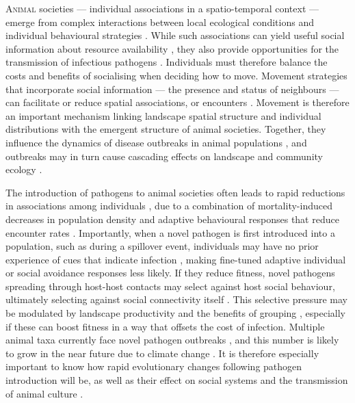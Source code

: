 
\newrefcontext[sorting=ynt]

\lettrine{A}{nimal} societies --- individual associations in a spatio-temporal context --- emerge from complex interactions between local ecological conditions and individual behavioural strategies \citep[][]{whitehead2008,tanner2012,webber2018}.
While such associations can yield useful social information about resource availability \citep{danchin2004,dall2005,gil2018}, they also provide opportunities for the transmission of infectious pathogens \citep[][]{krause2002,weinstein2018,romano2020,albery2021,cantor2021,romano2021}.
Individuals must therefore balance the costs and benefits of socialising when deciding how to move.
Movement strategies that incorporate social information --- the presence and status of neighbours --- can facilitate or reduce spatial associations, or encounters \citep{danchin2004,dall2005,nathan2008a,gil2018,webber2018,webber2022}.
Movement is therefore an important mechanism linking landscape spatial structure and individual distributions with the emergent structure of animal societies.
Together, they influence the dynamics of disease outbreaks in animal populations \citep{white2018a,romano2020,romano2021}, and outbreaks may in turn cause cascading effects on landscape and community ecology \citep{monk2022}.

The introduction of pathogens to animal societies often leads to rapid reductions in associations among individuals \citep[][]{romano2020}, due to a combination of mortality-induced decreases in population density \citep[e.g.][]{fereidouni2019} and adaptive behavioural responses that reduce encounter rates \citep{stroeymeyt2018,romano2020,stockmaier2021}.
Importantly, when a novel pathogen is first introduced into a population, such as during a spillover event, individuals may have no prior experience of cues that indicate infection \citep{power2004}, making fine-tuned adaptive individual or social avoidance responses less likely.
If they reduce fitness, novel pathogens spreading through host-host contacts may select against host social behaviour, ultimately selecting against social connectivity itself \citep{altizer2003,cantor2021,romano2021,poulin2021,ashby2022}.
This selective pressure may be modulated by landscape productivity \citep{hutchings2006} and the benefits of grouping \citep[][]{almberg2015,ezenwa2016}, especially if these can boost fitness in a way that offsets the cost of infection.
Multiple animal taxa currently face novel pathogen outbreaks \citep{blehert2009,globconsorth5n82016,fereidouni2019,scheele2019}, and this number is likely to grow in the near future due to climate change \citep{sanderson2020,carlson2022a}.
It is therefore especially important to know how rapid evolutionary changes following pathogen introduction will be, as well as their effect on social systems and the transmission of animal culture \citep{cantor2021, cantor2021a}.

